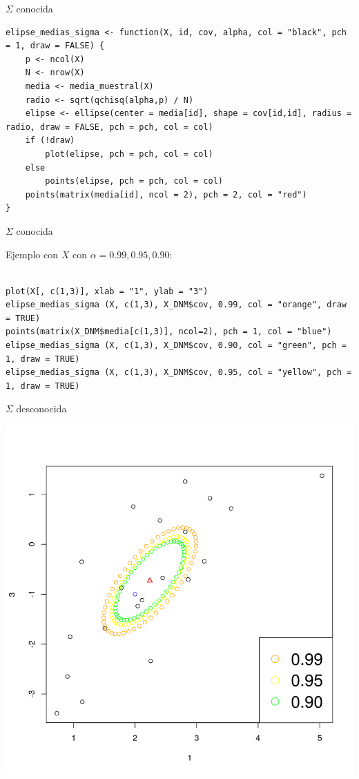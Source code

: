 \documentclass[xcolor=table]{beamer}
\begin{document}
\begin{frame}[fragile]{$\Sigma$ conocida}

\begin{lstlisting}
elipse_medias_sigma <- function(X, id, cov, alpha, col = "black", pch = 1, draw = FALSE) {
    p <- ncol(X)
    N <- nrow(X)
    media <- media_muestral(X)
    radio <- sqrt(qchisq(alpha,p) / N)
    elipse <- ellipse(center = media[id], shape = cov[id,id], radius = radio, draw = FALSE, pch = pch, col = col)
    if (!draw)
        plot(elipse, pch = pch, col = col)
    else
        points(elipse, pch = pch, col = col)
    points(matrix(media[id], ncol = 2), pch = 2, col = "red")
}
\end{lstlisting}
\end{frame}


\begin{frame}[fragile]{$\Sigma$ conocida}

Ejemplo con $X$ con $\alpha = 0.99, 0.95, 0.90$:

\begin{lstlisting}

plot(X[, c(1,3)], xlab = "1", ylab = "3")
elipse_medias_sigma (X, c(1,3), X_DNM$cov, 0.99, col = "orange", draw = TRUE)
points(matrix(X_DNM$media[c(1,3)], ncol=2), pch = 1, col = "blue")
elipse_medias_sigma (X, c(1,3), X_DNM$cov, 0.90, col = "green", pch = 1, draw = TRUE)
elipse_medias_sigma (X, c(1,3), X_DNM$cov, 0.95, col = "yellow", pch = 1, draw = TRUE)

\end{lstlisting}

\end{frame}

\begin{frame}[fragile]{$\Sigma$ desconocida}

\begin{center}
\includegraphics[scale=0.4]{superficie1.png}
\end{center}
\end{frame}
\end{document}
